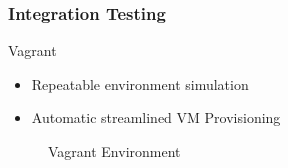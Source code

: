 \begin{frame}
\frametitle{Integration Testing}

\begin{block}{Vagrant}

\begin{itemize}
\item Repeatable environment simulation
\item Automatic streamlined VM Provisioning
\end{itemize}

\end{block}

\begin{figure}
\caption{Vagrant Environment}
\end{figure}

\end{frame}

